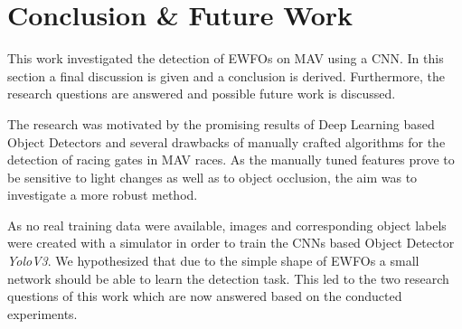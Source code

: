 \chapter{Conclusion \& Future Work}
\label{sec:conclusion}
This work investigated the detection of \acp{EWFO} on \ac{MAV} using a \ac{CNN}. In this section a final discussion is given and a conclusion is derived. Furthermore, the research questions are answered and possible future work is discussed.


The research was motivated by the promising results of Deep Learning based Object Detectors and several drawbacks of manually crafted algorithms for the detection of racing gates in \ac{MAV} races. As the manually tuned features prove to be sensitive to light changes as well as to object occlusion, the aim was to investigate a more robust method. 

As no real training data were available, images and corresponding object labels were created with a simulator in order to train the \acp{CNN} based Object Detector \textit{YoloV3}. We hypothesized that due to the simple shape of \acp{EWFO} a small network should be able to learn the detection task. This led to the two research questions of this work which are now answered based on the conducted experiments.

